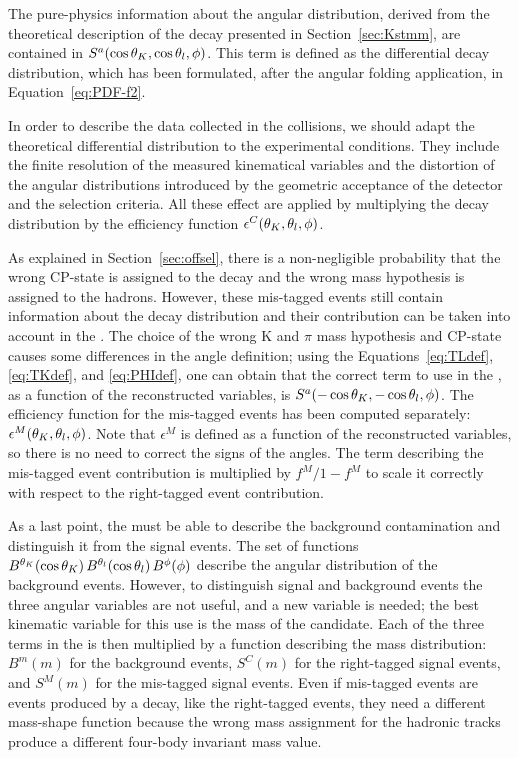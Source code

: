 
The pure-physics information about the angular distribution, derived from the theoretical description of the decay presented in Section~\ref{sec:Kstmm}, are contained in $S^a(\cos\theta_K,\cos\theta_l,\phi)$.
This term is defined as the differential decay distribution, which has been formulated, after the angular folding application, in Equation~\ref{eq:PDF-f2}.

In order to describe the data collected in the collisions, we should adapt the theoretical differential distribution to the experimental conditions.
They include the finite resolution of the measured kinematical variables and the distortion of the angular distributions introduced by the geometric acceptance of the detector and the selection criteria.
All these effect are applied by multiplying the decay distribution by the efficiency function $\epsilon^{C}(\theta_K,\theta_l,\phi)$.

As explained in Section~\ref{sec:offsel}, there is a non-negligible probability that the wrong CP-state is assigned to the decay and the wrong mass hypothesis is assigned to the hadrons.
However, these mis-tagged events still contain information about the decay distribution and their contribution can be taken into account in the \pdf.
The choice of the wrong $\textrm{K}$ and $\pi$ mass hypothesis and CP-state causes some differences in the angle definition; using the Equations~\ref{eq:TLdef}, \ref{eq:TKdef}, and \ref{eq:PHIdef}, one can obtain that the correct term to use in the \pdf, as a function of the reconstructed variables, is $S^a(-\cos\theta_K,-\cos\theta_l,\phi)$.
The efficiency function for the mis-tagged events has been computed separately: $\epsilon^{M}(\theta_K,\theta_l,\phi)$.
Note that $\epsilon^{M}$ is defined as a function of the reconstructed variables, so there is no need to correct the signs of the angles.
The term describing the mis-tagged event contribution is multiplied by ${f^{M}}/{1-f^{M}}$ to scale it correctly with respect to the right-tagged event contribution.

As a last point, the \pdf must be able to describe the background contamination and distinguish it from the signal events.
The set of functions $B^{\theta_K}(\cos\theta_K) \, B^{\theta_l}(\cos\theta_l) \, B^{\phi}(\phi)$ describe the angular distribution of the background events.
However, to distinguish signal and background events the three angular variables are not useful, and a new variable is needed; the best kinematic variable for this use is the mass of the \PBz candidate.
Each of the three terms in the \pdf is then multiplied by a function describing the mass distribution: $B^m(m)$ for the background events, $S^{C}(m)$ for the right-tagged signal events, and $S^{M}(m)$ for the mis-tagged signal events.
Even if mis-tagged events are events produced by a \PBz decay, like the right-tagged events, they need a different mass-shape function because the wrong mass assignment for the hadronic tracks produce a different four-body invariant mass value.

